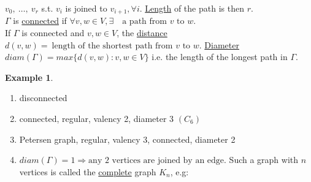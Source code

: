 \documentclass[]{article}
\theoremstyle{definition}
\newtheorem*{exmp}{Example}
\theoremstyle{remark}
\numberwithin{equation}{section}
\begin{document}
	$v_0,\ \hdots,\ v_r$ s.t. $v_i$ is joined to $v_{i+1}, \forall i$. \underline{Length} of the path is then $r$.\\
	$\Gamma$ is \underline{connected} if $\forall v,w \in V, \exists \quad \text{a path from $v$ to $w$}$.\\
	If $\Gamma$ is connected and $v,w \in V$, the \underline{distance} $d(v,w) =\ \text{length of the shortest path from $v$ to $w$}$.
	\underline{Diameter} $diam(\Gamma) = max\{d(v,w) : v,w \in V\}$ i.e. the length of the longest path in $\Gamma$.

	\begin{exmp}\hfill\\
		\begin{enumerate}
			\item disconnected\\


			\item connected, regular, valency 2, diameter 3 $(C_6)$\\
			\item Petersen graph, regular, valency 3, connected, diameter 2\\
			\item
				$diam(\Gamma) = 1 \Rightarrow \text{any 2 vertices are joined by an edge}$. Such a graph with $n$ vertices is called the \underline{complete} graph $K_n$, e.g:\\

		\end{enumerate}
	\end{exmp}
\end{document}

